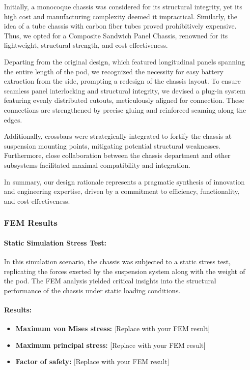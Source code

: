 Initially, a monocoque chassis was considered for its structural integrity, yet its high cost and manufacturing complexity deemed it impractical. Similarly, the idea of a tube chassis with carbon fiber tubes proved prohibitively expensive. Thus, we opted for a Composite Sandwich Panel Chassis, renowned for its lightweight, structural strength, and cost-effectiveness. 

Departing from the original design, which featured longitudinal panels spanning the entire length of the pod, we recognized the necessity for easy battery extraction from the side, prompting a redesign of the chassis layout. To ensure seamless panel interlocking and structural integrity, we devised a plug-in system featuring evenly distributed cutouts, meticulously aligned for connection. These connections are strengthened by precise gluing and reinforced seaming along the edges.

Additionally, crossbars were strategically integrated to fortify the chassis at suspension mounting points, mitigating potential structural weaknesses. Furthermore, close collaboration between the chassis department and other subsystems facilitated maximal compatibility and integration.

In summary, our design rationale represents a pragmatic synthesis of innovation and engineering expertise, driven by a commitment to efficiency, functionality, and cost-effectiveness.


\subsubsection{FEM Results}

\paragraph{Static Simulation Stress Test:}
In this simulation scenario, the chassis was subjected to a static stress test, replicating the forces exerted by the suspension system along with the weight of the pod. The FEM analysis yielded critical insights into the structural performance of the chassis under static loading conditions.

\paragraph{Results:}
\begin{itemize}
    \item\textbf{Maximum von Mises stress:} [Replace with your FEM result]
    \item\textbf{Maximum principal stress:} [Replace with your FEM result]
    \item\textbf{Factor of safety:} [Replace with your FEM result]
\end{itemize}

